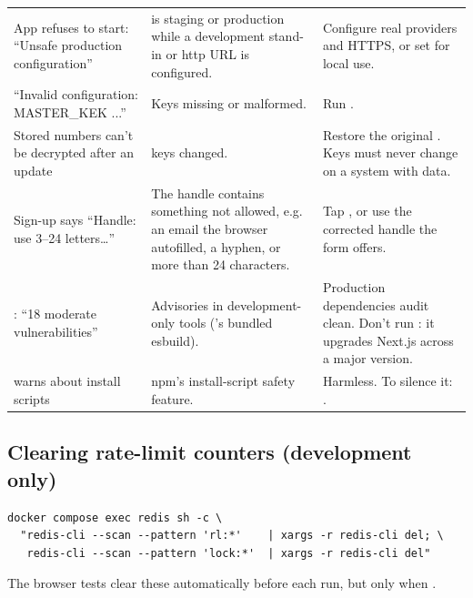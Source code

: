 \begin{longtable}{@{}L{4.6cm}L{4.4cm}p{6.3cm}@{}}
App refuses to start: ``Unsafe production configuration'' &  is staging or production while a development stand-in or http URL is configured. & Configure real providers and HTTPS, or set  for local use. \\
``Invalid configuration: MASTER\_KEK ...'' & Keys missing or malformed. & Run . \\
Stored numbers can't be decrypted after an update &  keys changed. & Restore the original . Keys must never change on a system with data. \\
Sign-up says ``Handle: use 3--24 letters\ldots'' & The handle contains something not allowed, e.g. an email the browser autofilled, a hyphen, or more than 24 characters. & Tap , or use the corrected handle the form offers. \\
: ``18 moderate vulnerabilities'' & Advisories in development-only tools ('s bundled esbuild). & Production dependencies audit clean. Don't run : it upgrades Next.js across a major version. \\
 warns about install scripts & npm's install-script safety feature. & Harmless. To silence it: . \\
\bottomrule
\end{longtable}

\subsection*{Clearing rate-limit counters (development only)}

\begin{lstlisting}
docker compose exec redis sh -c \
  "redis-cli --scan --pattern 'rl:*'    | xargs -r redis-cli del; \
   redis-cli --scan --pattern 'lock:*'  | xargs -r redis-cli del"
\end{lstlisting}

The browser tests clear these automatically before each run, but only when .
